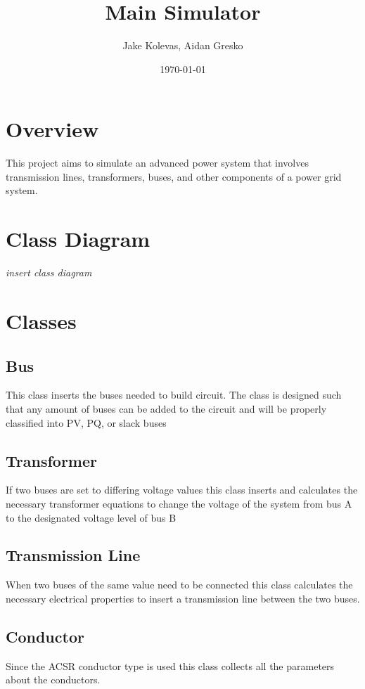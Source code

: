 \documentclass{article}
\author{Jake Kolevas, Aidan Gresko}
\title{Main Simulator}
\date{\today}
\begin{document}
	\maketitle
	
	\section{Overview}
	This project aims to simulate an advanced power system that involves transmission lines, transformers, buses, and other components of a power grid system.
	
	\section{Class Diagram}
	
	\textit{insert class diagram}
	
	\section{Classes}
	
	\subsection{Bus}
	This class inserts the buses needed to build circuit. The class is designed such that any amount of buses can be added to the circuit and will be properly classified into PV, PQ, or slack buses
	
	\subsection{Transformer}
	If two buses are set to differing voltage values this class inserts and calculates the necessary transformer equations to change the voltage of the system from bus A to the designated voltage level of bus B
	
	\subsection{Transmission Line}
	When two buses of the same value need to be connected this class calculates the necessary electrical properties to insert a transmission line between the two buses.
	
	\subsection{Conductor}
	Since the ACSR conductor type is used this class collects all the parameters about the conductors.
	
\end{document}
